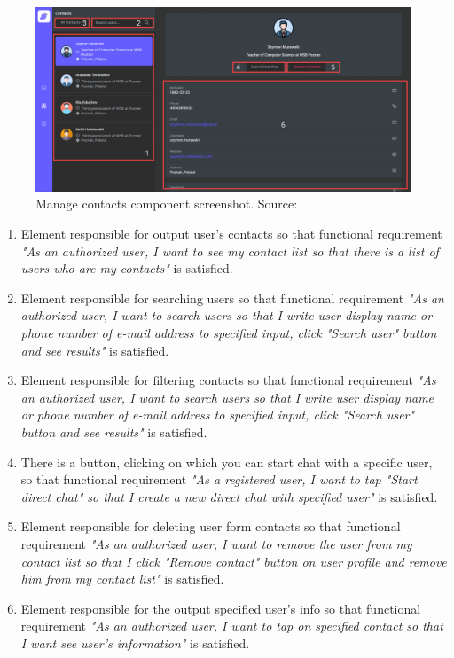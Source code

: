 \begin{figure}[H]
    \centering
    \includegraphics[width=1\textwidth]{Pictures/10_Messenger_manage_contacts}
    \caption{Manage contacts component screenshot. Source: }\label{fig:figure10}
\end{figure}
\begin{enumerate}
    \item Element responsible for output user's contacts so that functional requirement
    \textit{"As an authorized user, I want to see my contact list so that there is a list of users
    who are my contacts"} is satisfied.
    \item Element responsible for searching users so that functional requirement
    \textit{"As an authorized user, I want to search users so that I write user display name or phone number
    of e-mail address to specified input, click "Search user" button and see
    results"} is satisfied.
    \item Element responsible for filtering contacts so that functional requirement
    \textit{"As an authorized user, I want to search users so that I write user display name or phone number of e-mail
    address to specified input, click "Search user" button and see results"} is satisfied.
    \item There is a button, clicking on which you can start chat with a specific user, so that functional requirement
    \textit{"As a registered user, I want to tap "Start direct chat" so that I create a new direct
    chat with specified user"} is satisfied.
    \item Element responsible for deleting user form contacts so that functional requirement
    \textit{"As an authorized user, I want to remove the user from my contact list so that I click "Remove contact"
    button on user profile and remove him from my contact list"} is satisfied.
    \item Element responsible for the output specified user's info so that functional requirement
    \textit{"As an authorized user, I want to tap on specified contact so that I want see user's information"}
    is satisfied.
\end{enumerate}

